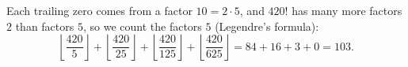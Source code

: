 Each trailing zero comes from a factor $10=2\cdot5$, and $420!$ has many more factors $2$ than factors $5$, so we count the factors $5$ (Legendre's formula):
\[
\left\lfloor\dfrac{420}{5}\right\rfloor+\left\lfloor\dfrac{420}{25}\right\rfloor+\left\lfloor\dfrac{420}{125}\right\rfloor+\left\lfloor\dfrac{420}{625}\right\rfloor=84+16+3+0=\boxed{103}.
\]
